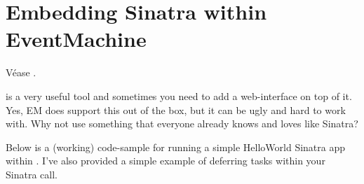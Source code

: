 \section{Embedding Sinatra within EventMachine}

Véase 
.

\eventmachine{} is a very useful tool and sometimes you need to add a
web-interface on top of it. Yes, EM does support this out of the
box, but it can be ugly and hard to work with. Why not use something
that everyone already knows and loves like Sinatra?

Below is a (working) code-sample for running a simple HelloWorld
Sinatra app within \EventMachine{}. I've also provided a simple example
of deferring tasks within your Sinatra call.


